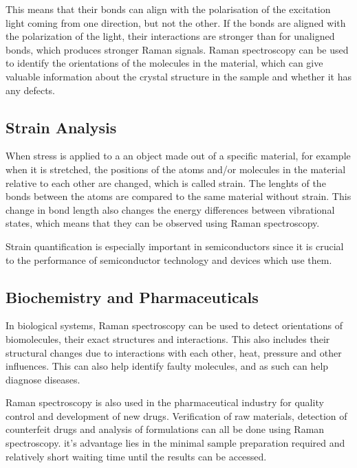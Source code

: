 \bigskip

This means that their bonds can align with the polarisation of the excitation light coming from one direction, but not the other. If the bonds are aligned with the polarization of the light, their interactions are stronger than for unaligned bonds, which produces stronger Raman signals. Raman spectroscopy can be used to identify the orientations of the molecules in the material, which can give valuable information about the crystal structure in the sample and whether it has any defects. 
\cite{RSAA}

\subsection{Strain Analysis}
When stress is applied to a an object made out of a specific material, for example when it is stretched, the positions of the atoms and/or molecules in the material relative to each other are changed, which is called strain. The lenghts of the bonds between the atoms are compared to the same material without strain. This change in bond length also changes the energy differences between vibrational states, which means that they can be observed using Raman spectroscopy.

\bigskip

Strain quantification is especially important in semiconductors since it is crucial to the performance of semiconductor technology and devices which use them. 
\cite{semiconductors}

\subsection{Biochemistry and Pharmaceuticals}
 In biological systems, Raman spectroscopy can be used to detect orientations of biomolecules, their exact structures and interactions. This also includes their structural changes due to interactions with each other, heat, pressure and other influences. This can also help identify faulty molecules, and as such can help diagnose diseases.

 \bigskip

 Raman spectroscopy is also used in the pharmaceutical industry for quality control and development of new drugs. Verification of raw materials, detection of counterfeit drugs and analysis of formulations can all be done using Raman spectroscopy. it's advantage lies in the minimal sample preparation required and relatively short waiting time until the results can be accessed.\cite{pharma}

